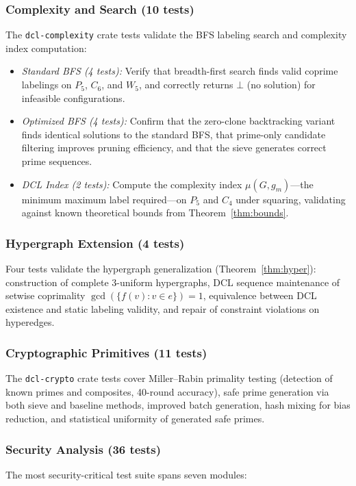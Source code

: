 \documentclass[lettersize,journal]{IEEEtran}
\begin{document}
\subsubsection{Complexity and Search (10 tests)}
The \texttt{dcl-complexity} crate tests validate the BFS labeling search and complexity index computation:

\begin{itemize}
\item \emph{Standard BFS (4 tests):} Verify that breadth-first search finds valid coprime labelings on $P_5$, $C_6$, and $W_5$, and correctly returns $\bot$ (no solution) for infeasible configurations.

\item \emph{Optimized BFS (4 tests):} Confirm that the zero-clone backtracking variant finds identical solutions to the standard BFS, that prime-only candidate filtering improves pruning efficiency, and that the sieve generates correct prime sequences.

\item \emph{DCL Index (2 tests):} Compute the complexity index $\mu(G, g_m)$---the minimum maximum label required---on $P_5$ and $C_4$ under squaring, validating against known theoretical bounds from Theorem~\ref{thm:bounds}.
\end{itemize}

\subsubsection{Hypergraph Extension (4 tests)}
Four tests validate the hypergraph generalization (Theorem~\ref{thm:hyper}): construction of complete 3-uniform hypergraphs, DCL sequence maintenance of setwise coprimality $\gcd(\{f(v) : v \in e\}) = 1$, equivalence between DCL existence and static labeling validity, and repair of constraint violations on hyperedges.

\subsubsection{Cryptographic Primitives (11 tests)}
The \texttt{dcl-crypto} crate tests cover Miller--Rabin primality testing (detection of known primes and composites, 40-round accuracy), safe prime generation via both sieve and baseline methods, improved batch generation, hash mixing for bias reduction, and statistical uniformity of generated safe primes.

\subsubsection{Security Analysis (36 tests)}
The most security-critical test suite spans seven modules:
\end{document}
